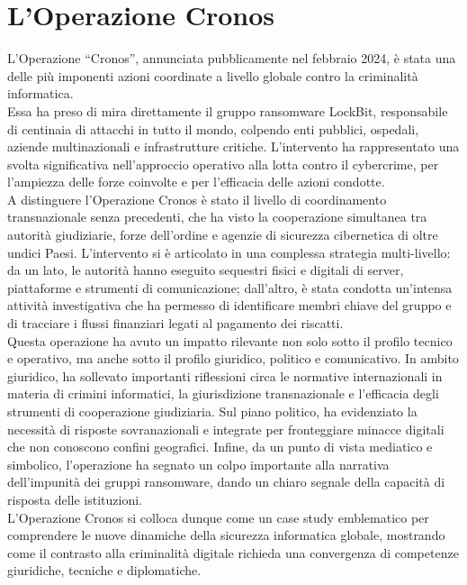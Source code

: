 \documentclass[a4paper,12pt,twoside]{article}
\begin{document}
\section{L'Operazione Cronos}
L'Operazione “Cronos”, annunciata pubblicamente nel febbraio 2024, è stata una delle più imponenti azioni coordinate a livello globale contro la criminalità informatica.\\
Essa ha preso di mira direttamente il gruppo ransomware LockBit, responsabile di centinaia di attacchi in tutto il mondo, colpendo enti pubblici, ospedali, aziende multinazionali e infrastrutture critiche. L'intervento ha rappresentato una svolta significativa nell'approccio operativo alla lotta contro il cybercrime, per l'ampiezza delle forze coinvolte e per l'efficacia delle azioni condotte.\\
A distinguere l'Operazione Cronos è stato il livello di coordinamento transnazionale senza precedenti, che ha visto la cooperazione simultanea tra autorità giudiziarie, forze dell'ordine e agenzie di sicurezza cibernetica di oltre undici Paesi. L'intervento si è articolato in una complessa strategia multi-livello: da un lato, le autorità hanno eseguito sequestri fisici e digitali di server, piattaforme e strumenti di comunicazione; dall'altro, è stata condotta un'intensa attività investigativa che ha permesso di identificare membri chiave del gruppo e di tracciare i flussi finanziari legati al pagamento dei riscatti.\\
Questa operazione ha avuto un impatto rilevante non solo sotto il profilo tecnico e operativo, ma anche sotto il profilo giuridico, politico e comunicativo. In ambito giuridico, ha sollevato importanti riflessioni circa le normative internazionali in materia di crimini informatici, la giurisdizione transnazionale e l'efficacia degli strumenti di cooperazione giudiziaria. Sul piano politico, ha evidenziato la necessità di risposte sovranazionali e integrate per fronteggiare minacce digitali che non conoscono confini geografici. Infine, da un punto di vista mediatico e simbolico, l'operazione ha segnato un colpo importante alla narrativa dell'impunità dei gruppi ransomware, dando un chiaro segnale della capacità di risposta delle istituzioni.\\
L'Operazione Cronos si colloca dunque come un case study emblematico per comprendere le nuove dinamiche della sicurezza informatica globale, mostrando come il contrasto alla criminalità digitale richieda una convergenza di competenze giuridiche, tecniche e diplomatiche.
\end{document}
